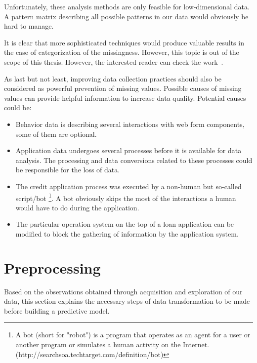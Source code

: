 Unfortunately, these analysis methods are only feasible for low-dimensional data. A pattern matrix describing all possible patterns in our data would obviously be hard to manage.

It is clear that more sophisticated techniques would produce valuable results in the case of categorization of the missingness. However, this topic is out of the scope of this thesis. However, the interested reader can check the work~\cite{Mohan;Pearl:2014}.

As last but not least, improving data collection practices should also be considered as powerful prevention of missing values. Possible causes of missing values can provide helpful information to increase data quality. 
Potential causes could be:
    \begin{itemize}
    
        \item Behavior data is describing several interactions with web form components, some of them are optional.
        
        \item Application data undergoes several processes before it is available for data analysis. The processing and data conversions related to these processes could be responsible for the loss of data.
        
        \item The credit application process was executed by a non-human but so-called script/bot \footnote{A bot (short for "robot") is a program that operates as an agent for a user or another program or simulates a human activity on the Internet. (http://searchsoa.techtarget.com/definition/bot)}. A bot obviously skips the most of the interactions a human would have to do during the application. 
    
        \item The particular operation system on the top of a loan application can be modified to block the gathering of information by the application system.
    \end{itemize}

\section{Preprocessing}\label{Ch:2:Preprocessing}
Based on the observations obtained through acquisition and exploration of our data, this section explains the necessary steps of data transformation to be made before building a predictive model.

